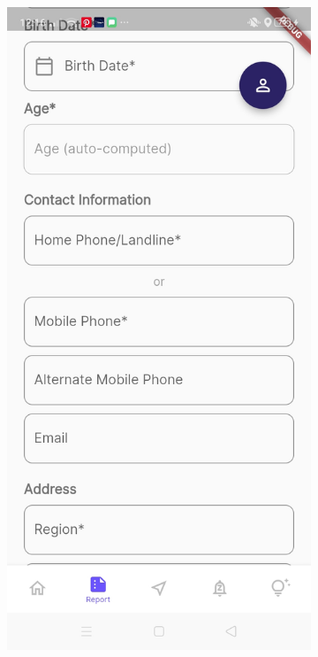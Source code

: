 \begin{figure}[!h]
\begin{subfigure}[c]{0.30\linewidth}
    \end{subfigure}
    \centering
    \begin{subfigure}[c]{0.30\linewidth}
        \centering
        \includegraphics[scale=0.15]{figures/Chapter4/Main/p3-3.jpg}

\end{subfigure}
\end{figure}
